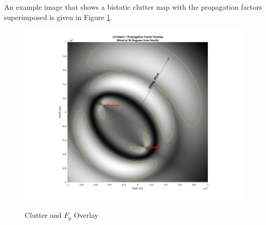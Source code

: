 An example image that shows a bistatic clutter map with the propagation factors superimposed is given in Figure \ref{bc_fig:1}. 

\begin{figure}[H]
  \begin{center}
\includegraphics[width=5in]{../media/analysis/FpCCSOverlay.png}
  \end{center}
  \renewcommand{\baselinestretch}{1} \small\normalsize
  \begin{quote}
    \caption[Clutter and $F_p$ Overlay]{Clutter and $F_p$ Overlay\label{bc_fig:1}}
  \end{quote}
\end{figure}
\renewcommand{\baselinestretch}{2} \small\normalsize